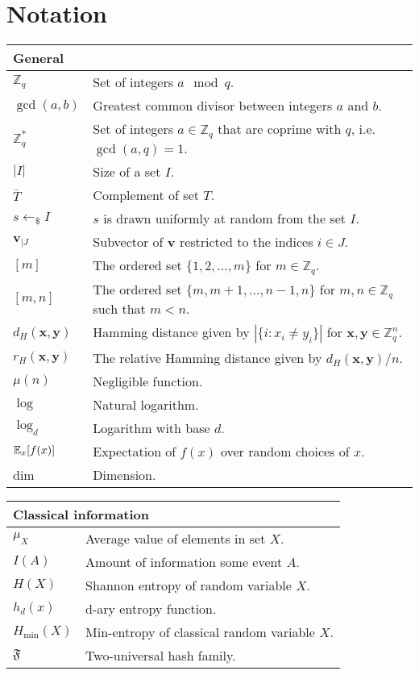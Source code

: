 \chapter*{Notation}


\newcommand{\tabstart}[1]{\noindent \begin{tabular}{p{2.95cm}p{12cm}}
    \multicolumn{2}{l}{{\bf #1}} \\ 
    \hline}

\newcommand{\tabstop}{\hline \end{tabular}}

\newcommand{\tabinter}{\vspace{1ex}}

\tabstart{General}
$\mathbb{Z}_q$ & Set of integers $a \mod q$.\\
$\gcd (a,b)$ & Greatest common divisor between integers $a$ and $b$.\\
$\mathbb{Z}^*_q$ & Set of integers $a\in\mathbb{Z}_q$ that are coprime with $q$, i.e. $\gcd (a,q) = 1$.\\
$|I|$ & Size of a set $I$.\\
$\bar{T}$ & Complement of set $T$.\\
$s\leftarrow_{\$}I$ & $s$ is drawn uniformly at random from the set $I$.\\
$\bm{v}_{|J}$ & Subvector of $\bm{v}$ restricted to the indices $i \in J$.\\
$[m]$ & The ordered set $\{1, 2, \ldots, m\}$ for $m\in \mathbb{Z}_q$.\\
$[m, n]$ & The ordered set $\{m, m+1, \dots, n-1, n\}$ for $m, n\in \mathbb{Z}_q$ such that $m<n$.\\
$d_H(\bm{x}, \bm{y})$ & Hamming distance given by $ |\{ i : x_i \neq y_i \}|$ for $\bm{x},\bm{y}\in\mathbb{Z}^n_q$.\\
$r_H(\bm{x}, \bm{y})$ & The relative Hamming distance given by $d_H(\bm{x}, \bm{y})/n$.\\
$\mu(n)$ & Negligible function.\\
  $\log$ & Natural logarithm.\\
 $\log_d$ & Logarithm with base $d$.\\
  $\operatorname*{\mathbb{E}}_{x}[f(x)]$ & Expectation of $f(x)$ over random choices of $x$.\\
  dim & Dimension.\\
\tabstop

\tabinter

\tabstart{Classical information}
$\mu_X$ & Average value of elements in set $X$.\\
$I(A)$ & Amount of information some event $A$.\\
$H(X)$ & Shannon entropy of random variable $X$.\\
$h_d(x)$ & d-ary entropy function.\\
$H_{\min}(X)$ & Min-entropy of classical random variable $X$.\\
$\mathfrak{F}$ & Two-universal hash family.\\
\tabstop

